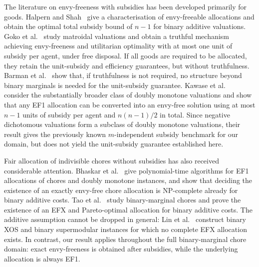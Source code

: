 \documentclass[11pt]{article}
\theoremstyle{plain}
\theoremstyle{plain}
\begin{document}
The literature on envy-freeness with subsidies has been developed primarily for goods. Halpern and Shah~\cite{HS19} give a characterisation of envy-freeable allocations and obtain the optimal total subsidy bound of $n-1$ for binary additive valuations. Goko et al.~\cite{goko2024fair} study matroidal valuations and obtain a truthful mechanism achieving envy-freeness and utilitarian optimality with at most one unit of subsidy per agent, under free disposal. If all goods are required to be allocated, they retain the unit-subsidy and efficiency guarantees, but without truthfulness. Barman et al.~\cite{BKNS22} show that, if truthfulness is not required, no structure beyond binary marginals is needed for the unit-subsidy guarantee. Kawase et al.~\cite{kawase2025towards} consider the substantially broader class of doubly monotone valuations and show that any EF1 allocation can be converted into an envy-free solution using at most $n-1$ units of subsidy per agent and $n(n-1)/2$ in total. Since negative dichotomous valuations form a subclass of doubly monotone valuations, their result gives the previously known $m$-independent subsidy benchmark for our domain, but does not yield the unit-subsidy guarantee established here.


Fair allocation of indivisible chores without subsidies has also received considerable attention. Bhaskar et al.~\cite{BSV21} give polynomial-time algorithms for EF1 allocations of chores and doubly monotone instances, and show that deciding the existence of an exactly envy-free chore allocation is NP-complete already for binary additive costs. Tao et al.~\cite{tao2025existence} study binary-marginal chores and prove the existence of an EFX and Pareto-optimal allocation for binary additive costs. The additive assumption cannot be dropped in general: Lin et al.~\cite{LLTZ26} construct binary XOS and binary supermodular instances for which no complete EFX allocation exists. In contrast, our result applies throughout the full binary-marginal chore domain: exact envy-freeness is obtained after subsidies, while the underlying allocation is always EF1.
\end{document}
